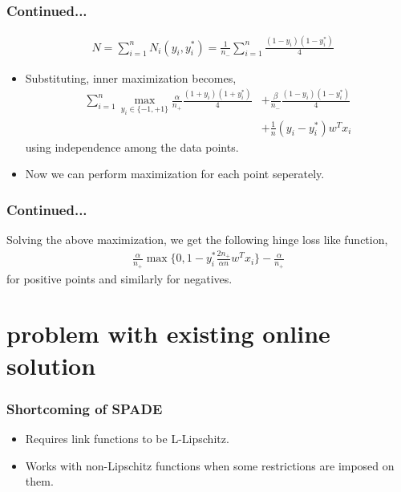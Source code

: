 \documentclass{beamer}
\begin{document}
\begin{frame}
	\frametitle{Continued...}
	\begin{align*}
	&N = \sum_{i=1}^nN_i(y_i,y_i^*)= \frac{1}{n_-}\sum_{i=1}^n\frac{(1-y_i)(1-y_i^*)}{4}
	\end{align*}
	\begin{itemize}
	\item Substituting, inner maximization becomes,
	\begin{align*}
	\sum_{i=1}^n\max_{y_i\in\{-1,+1\}}\frac{\alpha}{n_+}\frac{(1+y_i)(1+y_i^*)}{4} &+\frac{\beta}{n_-}\frac{(1-y_i)(1-y_i^*)}{4} \\
	&+ \frac{1}{n}(y_i - y_i^*)w^Tx_i
	\end{align*}
	using independence among the data points.
	\item Now we can perform maximization for each point seperately.
	\end{itemize}
\end{frame}
\begin{frame}
	\frametitle{Continued...}
	Solving the above maximization, we get the following hinge loss like function,
	\begin{align*}
	\frac{\alpha}{n_+}\max\{0,1-y_i^*\frac{2n_+}{\alpha n}w^Tx_i\} - \frac{\alpha}{n_+}
	\end{align*}
	for positive points and similarly for negatives.
\end{frame}

\section{problem with existing online solution} %

\begin{frame}
	\frametitle{Shortcoming of SPADE}
	\begin{itemize}
		\item Requires link functions to be L-Lipschitz.
		\item Works with non-Lipschitz functions when some restrictions are imposed on them.
	\end{itemize}
\end{frame}
\end{document}
